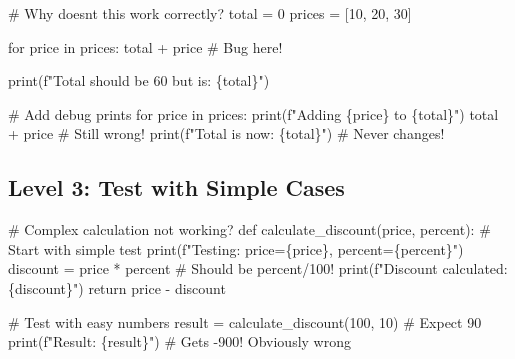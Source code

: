 \documentclass[
  letterpaper,
  DIV=11,
  numbers=noendperiod,
  oneside]{scrreprt}
\newenvironment{Shaded}{}{}
\newcommand{\BuiltInTok}[1]{\textcolor[rgb]{0.84,0.23,0.29}{#1}}
\newcommand{\CommentTok}[1]{\textcolor[rgb]{0.42,0.45,0.49}{#1}}
\newcommand{\ControlFlowTok}[1]{\textcolor[rgb]{0.84,0.23,0.29}{#1}}
\newcommand{\DecValTok}[1]{\textcolor[rgb]{0.00,0.36,0.77}{#1}}
\newcommand{\KeywordTok}[1]{\textcolor[rgb]{0.84,0.23,0.29}{#1}}
\newcommand{\NormalTok}[1]{\textcolor[rgb]{0.14,0.16,0.18}{#1}}
\newcommand{\OperatorTok}[1]{\textcolor[rgb]{0.14,0.16,0.18}{#1}}
\newcommand{\SpecialCharTok}[1]{\textcolor[rgb]{0.00,0.36,0.77}{#1}}
\newcommand{\SpecialStringTok}[1]{\textcolor[rgb]{0.01,0.18,0.38}{#1}}
\begin{document}
\begin{Shaded}
\begin{Highlighting}[]
\CommentTok{\# Why doesn\textquotesingle{}t this work correctly?}
\NormalTok{total }\OperatorTok{=} \DecValTok{0}
\NormalTok{prices }\OperatorTok{=}\NormalTok{ [}\DecValTok{10}\NormalTok{, }\DecValTok{20}\NormalTok{, }\DecValTok{30}\NormalTok{]}

\ControlFlowTok{for}\NormalTok{ price }\KeywordTok{in}\NormalTok{ prices:}
\NormalTok{    total }\OperatorTok{+}\NormalTok{ price  }\CommentTok{\# Bug here!}
    
\BuiltInTok{print}\NormalTok{(}\SpecialStringTok{f"Total should be 60 but is: }\SpecialCharTok{\{}\NormalTok{total}\SpecialCharTok{\}}\SpecialStringTok{"}\NormalTok{)}

\CommentTok{\# Add debug prints}
\ControlFlowTok{for}\NormalTok{ price }\KeywordTok{in}\NormalTok{ prices:}
    \BuiltInTok{print}\NormalTok{(}\SpecialStringTok{f"Adding }\SpecialCharTok{\{}\NormalTok{price}\SpecialCharTok{\}}\SpecialStringTok{ to }\SpecialCharTok{\{}\NormalTok{total}\SpecialCharTok{\}}\SpecialStringTok{"}\NormalTok{)}
\NormalTok{    total }\OperatorTok{+}\NormalTok{ price  }\CommentTok{\# Still wrong!}
    \BuiltInTok{print}\NormalTok{(}\SpecialStringTok{f"Total is now: }\SpecialCharTok{\{}\NormalTok{total}\SpecialCharTok{\}}\SpecialStringTok{"}\NormalTok{)  }\CommentTok{\# Never changes!}
\end{Highlighting}
\end{Shaded}

\subsection{Level 3: Test with Simple
Cases}\label{level-3-test-with-simple-cases}

\begin{Shaded}
\begin{Highlighting}[]
\CommentTok{\# Complex calculation not working?}
\KeywordTok{def}\NormalTok{ calculate\_discount(price, percent):}
    \CommentTok{\# Start with simple test}
    \BuiltInTok{print}\NormalTok{(}\SpecialStringTok{f"Testing: price=}\SpecialCharTok{\{}\NormalTok{price}\SpecialCharTok{\}}\SpecialStringTok{, percent=}\SpecialCharTok{\{}\NormalTok{percent}\SpecialCharTok{\}}\SpecialStringTok{"}\NormalTok{)}
\NormalTok{    discount }\OperatorTok{=}\NormalTok{ price }\OperatorTok{*}\NormalTok{ percent  }\CommentTok{\# Should be percent/100!}
    \BuiltInTok{print}\NormalTok{(}\SpecialStringTok{f"Discount calculated: }\SpecialCharTok{\{}\NormalTok{discount}\SpecialCharTok{\}}\SpecialStringTok{"}\NormalTok{)}
    \ControlFlowTok{return}\NormalTok{ price }\OperatorTok{{-}}\NormalTok{ discount}

\CommentTok{\# Test with easy numbers}
\NormalTok{result }\OperatorTok{=}\NormalTok{ calculate\_discount(}\DecValTok{100}\NormalTok{, }\DecValTok{10}\NormalTok{)  }\CommentTok{\# Expect 90}
\BuiltInTok{print}\NormalTok{(}\SpecialStringTok{f"Result: }\SpecialCharTok{\{}\NormalTok{result}\SpecialCharTok{\}}\SpecialStringTok{"}\NormalTok{)  }\CommentTok{\# Gets {-}900! Obviously wrong}
\end{Highlighting}
\end{Shaded}
\end{document}
